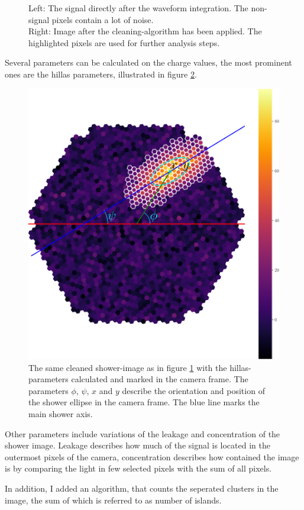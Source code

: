 \begin{figure}
\begin{subfigure}{.48\textwidth}
	\end{subfigure}
	\caption{
		Left: The signal directly after
		the waveform integration. The non-signal pixels contain a lot of noise. \\
		Right: Image after the cleaning-algorithm has been 
		applied. The highlighted pixels are used for further analysis steps.}
	\label{fig:shower_cleaning}
\end{figure}

Several parameters can be calculated on the charge values, the most prominent ones are the 
hillas parameters, illustrated in figure \ref{fig:hillas_params}.

\begin{figure}
	\centering	
	\captionsetup{width=0.9\linewidth}
	\includegraphics[width=.6\textwidth]{Plots/hillas_cleaned_params.pdf}
	\caption{The same cleaned shower-image as in figure \ref{fig:shower_cleaning}
	with the hillas-parameters calculated and marked in the camera frame.
	The parameters $\phi$, $\psi$, $x$ and $y$ describe the 
	orientation and position of the shower ellipse in the camera frame.
  The blue line marks the main shower axis.}
	\label{fig:hillas_params}
\end{figure}

Other parameters include variations of the leakage and concentration of the shower image.
Leakage describes how much of the signal is located in the outermost pixels of the camera, 
concentration describes how contained the image is by comparing the light in 
few selected pixels with the sum of all pixels.

In addition, I added an algorithm, that counts the seperated clusters in the image,
the sum of which is referred to as number of islands.

